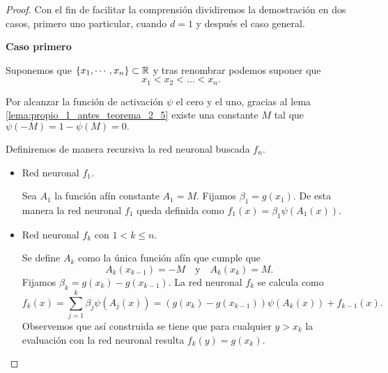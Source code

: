 \begin{proof}
Con el fin de facilitar la comprensión dividiremos la demostración en dos casos, 
primero uno particular, cuando $d=1$ y después el caso general.

\textbf{Caso primero}

Suponemos que $\{x_1, \cdots, x_n\} \subset \mathbb{R}$ y tras renombrar 
podemos suponer que 
\begin{equation}
    x_1 < x_2 < \ldots < x_n. 
\end{equation}

Por alcanzar la función de activación $\psi$ el cero y el uno, 
gracias al lema  \ref{lema:propio_1_antes_teorema_2_5} existe una constante $M$ tal que $\psi(-M) = 1-\psi(M) = 0.$

Definiremos de manera recursiva la red neuronal buscada $f_n$.

\setlength{\marginparwidth}{\smallMarginSize}
\reversemarginpar
{}
\normalmarginpar

\begin{itemize}
    \item Red neuronal $f_1$. 

Sea $A_1$ la función afín constante $A_1 = M.$
Fijamos $\beta_1 = g(x_1)$. 
De esta manera la red neuronal $f_1$ queda
definida como $f_1(x) = \beta_1 \psi(A_1(x)).$

\item Red neuronal $f_k$ con $1 < k \leq n$. 

Se define $A_{k}$ como la única función afín que cumple que 
\begin{equation}
    A_k(x_{k-1}) = -M \quad \text{y} \quad  A_{k}(x_k)= M.
\end{equation}
Fijamos $\beta_k = g(x_k) - g(x_{k-1})$. 
La red neuronal $f_k$ se calcula como 
\begin{equation}
    f_k(x) 
    = 
    \sum_{j=1}^k \beta_j \psi(A_j(x))
     = 
    (g(x_k)-g(x_{k-1})) \psi(A_k(x)) + f_{k-1}(x) .  
\end{equation}
Observemos que así construida se tiene que para cualquier
 $y > x_k$ la evaluación con la red neuronal resulta $f_k(y) = g(x_k).$
\end{itemize}


\end{proof}
